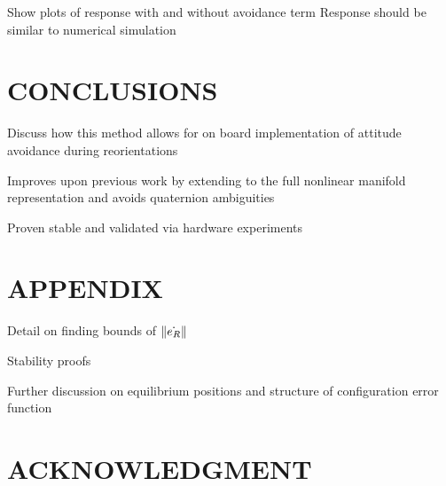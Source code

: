\documentclass[letterpaper, 10 pt, conference]{ieeeconf}  %
\begin{document}
Show plots of response with and without avoidance term
Response should be similar to numerical simulation

\section{CONCLUSIONS}

Discuss how this method allows for on board implementation of attitude avoidance during reorientations

Improves upon previous work by extending to the full nonlinear manifold representation and avoids quaternion ambiguities

Proven stable and validated via hardware experiments

\addtolength{\textheight}{-12cm}   %







\section*{APPENDIX}

Detail on finding bounds of \( \left\| \dot{e_R} \right\| \)

Stability proofs

Further discussion on equilibrium positions and structure of configuration error function

\section*{ACKNOWLEDGMENT}







\end{document}
